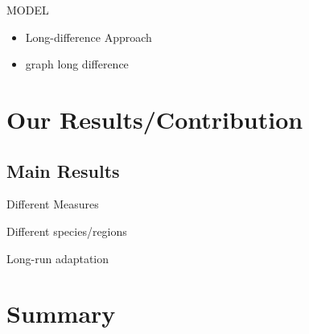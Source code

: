 \documentclass{beamer}
\begin{document}
\begin{frame}{MODEL}
  \begin{itemize}
    \item Long-difference Approach
    \item {graph long difference}
  \end{itemize}
\end{frame}


\section{Our Results/Contribution}

\subsection{Main Results}

\begin{frame}{Different Measures}
\end{frame}

\begin{frame}{Different species/regions}
\end{frame}

\begin{frame}{Long-run adaptation}
\end{frame}




\section*{Summary}
\end{document}
